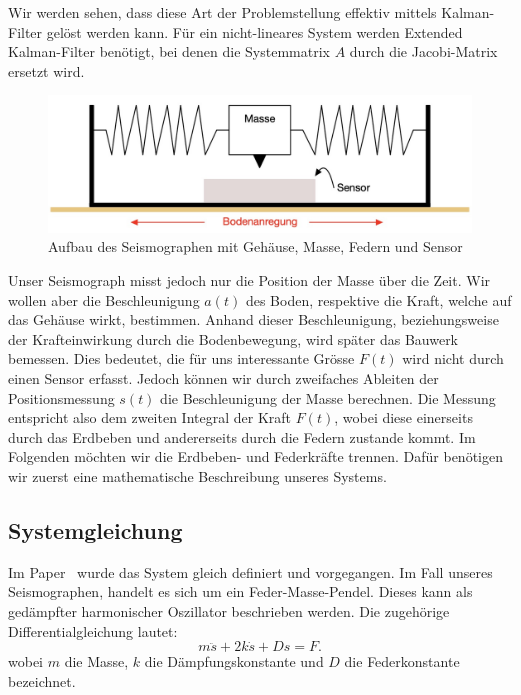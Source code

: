Wir werden sehen, dass diese Art der Problemstellung effektiv mittels Kalman-Filter gelöst werden kann.
%
Für ein nicht-lineares System werden Extended Kalman-Filter benötigt,
%
bei denen die Systemmatrix $A$ durch die Jacobi-Matrix ersetzt wird.
%
%

\begin{figure}
 \begin{center}
 \includegraphics[width=\linewidth,keepaspectratio]{papers/erdbeben/Apperatur}
 \caption{Aufbau des Seismographen mit Gehäuse, Masse, Federn und Sensor}
 \label{erdbeben:Seismograph}
 \end{center}
\end{figure}

Unser Seismograph misst jedoch nur die Position der Masse über die Zeit. 
Wir wollen aber die Beschleunigung $a(t)$ des Boden,
respektive die Kraft,
welche auf das Gehäuse wirkt, bestimmen.  
Anhand dieser Beschleunigung,
beziehungsweise der Krafteinwirkung durch die Bodenbewegung,
wird später das Bauwerk bemessen.
Dies bedeutet, die für uns interessante Grösse $F(t)$ wird nicht durch einen Sensor erfasst. 
Jedoch können wir durch zweifaches Ableiten der Positionsmessung $s(t)$ die Beschleunigung der Masse berechnen. 
Die Messung entspricht also dem zweiten Integral der Kraft $F(t)$,
wobei diese einerseits durch das Erdbeben und andererseits durch die Federn zustande kommt.
Im Folgenden möchten wir die Erdbeben- und Federkräfte trennen.
Dafür benötigen wir zuerst eine mathematische Beschreibung unseres Systems.

\subsection{Systemgleichung}
Im Paper~\cite{erdbeben:mueller2008deconvolving} wurde das System gleich definiert und vorgegangen. 
Im Fall unseres Seismographen, handelt es sich um ein Feder-Masse-Pendel.
%
Dieses kann als gedämpfter harmonischer Oszillator beschrieben werden. 
%
Die zugehörige Differentialgleichung lautet:
\begin{equation}
	\label{erdbeben:Systemgleichung}
m\ddot s + 2k \dot s + Ds = F.
\end{equation}
wobei $m$ die Masse, $k$ die Dämpfungskonstante und $D$ die Federkonstante bezeichnet.
%
%

